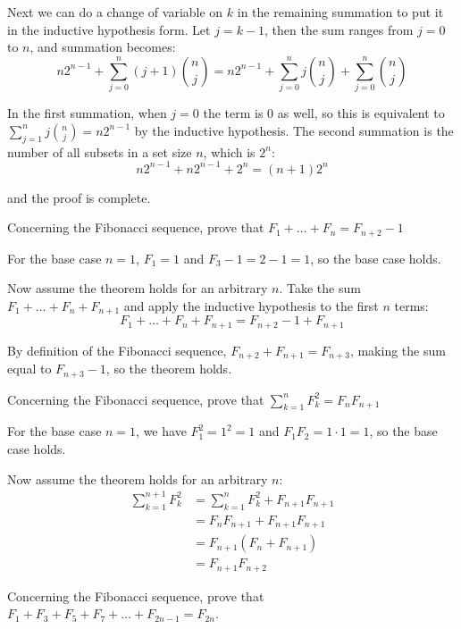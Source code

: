 \documentclass{article}
\begin{document}
Next we can do a change of variable on $k$ in the remaining summation to put it in the inductive hypothesis form. Let $j = k - 1$, then the sum ranges from $j = 0$ to $n$, and summation becomes:
$$n2^{n-1} + \sum_{j=0}^n (j + 1)\binom{n}{j} = n2^{n-1} + \sum_{j=0}^n j\binom{n}{j} + \sum_{j=0}^n \binom{n}{j}$$

In the first summation, when $j = 0$ the term is 0 as well, so this is equivalent to $\sum_{j=1}^n j \binom{n}{j} = n2^{n-1}$ by the inductive hypothesis. The second summation is the number of all subsets in a set size $n$, which is $2^n$:
$$n2^{n-1} + n2^{n-1} + 2^n = (n+1)2^n$$

and the proof is complete.

\begin{problem}
Concerning the Fibonacci sequence, prove that $F_1 + \ldots + F_n = F_{n+2} - 1$
\end{problem}

For the base case $n = 1$, $F_1 = 1$ and $F_3 - 1 = 2 - 1 = 1$, so the base case holds.

Now assume the theorem holds for an arbitrary $n$. Take the sum $F_1 + \ldots + F_n + F_{n+1}$ and apply the inductive hypothesis to the first $n$ terms:
$$F_1 + \ldots + F_n + F_{n+1} = F_{n+2} - 1 + F_{n+1}$$

By definition of the Fibonacci sequence, $F_{n+2} + F_{n+1} = F_{n+3}$, making the sum equal to $F_{n+3} - 1$, so the theorem holds.

\begin{problem}
Concerning the Fibonacci sequence, prove that $\sum_{k=1}^n F^2_k = F_n F_{n+1}$
\end{problem}

For the base case $n = 1$, we have $F_1^2 = 1^2 = 1$ and $F_1 F_2 = 1\cdot1 = 1$, so the base case holds.

Now assume the theorem holds for an arbitrary $n$:
\begin{align*}
  \sum_{k=1}^{n+1} F_k^2 & = \sum_{k=1}^n F_k^2 + F_{n+1}F_{n+1} \\
                         & = F_n F_{n+1} + F_{n+1}F_{n+1}        \\
                         & = F_{n+1}(F_n + F_{n+1})              \\
                         & = F_{n+1}F_{n+2}
\end{align*}

\begin{problem}
Concerning the Fibonacci sequence, prove that $F_1 + F_3 + F_5 + F_7 + \ldots + F_{2n-1} = F_{2n}$.
\end{problem}
\end{document}
